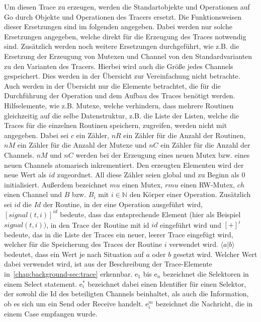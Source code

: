 Um diesen Trace zu erzeugen, werden die Standartobjekte und Operationen auf Go durch Objekte und Operationen 
des Tracers ersetzt. Die Funktionsweisen dieser Ersetzungen sind im folgenden 
angegeben. Dabei werden nur solche Ersetzungen angegeben, welche direkt 
für die Erzeugung
des Traces notwendig sind. Zusätzlich werden noch 
weitere Ersetzungen durchgeführt, wie z.B. die Ersetzung der Erzeugung von 
Mutexen und Channel von den Standardvarianten zu den Varianten des Tracers.
Hierbei wird auch die Größe jedes Channels gespeichert.
Dies werden in der Übersicht zur Vereinfachung nicht betrachte. Auch werden 
in der Übersicht nur die Elemente betrachtet, die für die Durchführung der 
Operation und dem Aufbau des Traces benötigt werden. Hilfselemente, wie z.B. 
Mutexe, welche verhindern, dass mehrere Routinen gleichzeitig auf die selbe 
Datenstruktur, 
z.B. die Liste der Listen, welche die Traces für die einzelnen Routinen 
speichern, zugreifen, werden nicht mit angegeben. Dabei sei $c$ ein 
Zähler, $nR$ ein Zähler für die Anzahl der Routinen, $nM$ ein Zähler für die 
Anzahl der Mutexe und $nC$ ein Zähler für die Anzahl der Channels. $nM$ und $nC$
werden bei der Erzeugung eines neuen Mutex bzw. eines neuen Channels atomarisch 
inkrementiert. Den erzeugten Elementen wird der neue Wert als $id$ zugeordnet. All diese 
Zähler seien global und zu Beginn als $0$ initialisiert. Außerdem bezeichnet 
$mu$ einen Mutex, $rmu$ einen RW-Mutex, $ch$ einen Channel und $B$ bzw. $B_i$
mit $i\in\mathbb{N}$ den 
Körper einer Operation. Zusätzlich
sei $id$ die $Id$ der Routine, in der eine Operation ausgeführt wird,
$[signal(t, i)]^{id}$ bedeute, dass das entsprechende Element (hier als 
Beispiel $signal(t, i))$, in den Trace der Routine mit id $id$ eingeführt wird
und $[+]^i$ bedeute, das in die Liste der Traces ein neuer, leerer Trace 
eingefügt wird, welcher für die Speicherung des Traces der Routine $i$ 
verwendet wird. 
$\langle a|b\rangle$ bedeutet, dass ein Wert je nach Situation auf $a$ oder $b$ gesetzt 
wird. Welcher Wert dabei verwendet wird, ist aus der Beschreibung der 
Trace-Elemente in~\ref{chap:background-sec:trace} erkennbar. 
$\text{e}_1$ bis $\text{e}_n$ bezeichnet die Selektoren in einem Select statement.
$\text{e}_i^*$ bezeichnet dabei einen Identifier für einen Selektor, der sowohl die 
Id des beteiligten Channels beinhaltet, als auch die Information, ob es sich um ein 
Send oder Receive handelt. $\text{e}_i^m$ bezeichnet die Nachricht, die in einem Case 
empfangen wurde. 
